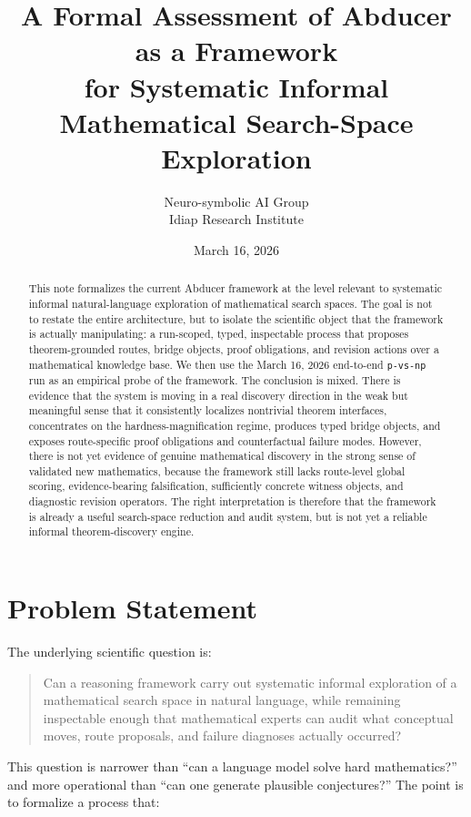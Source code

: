 \documentclass[11pt]{article}
\title{A Formal Assessment of Abducer as a Framework\\for Systematic Informal Mathematical Search-Space Exploration}
\author{Neuro-symbolic AI Group\\Idiap Research Institute}
\date{March 16, 2026}
\begin{document}
\maketitle

\begin{abstract}
This note formalizes the current Abducer framework at the level relevant to systematic informal natural-language exploration of mathematical search spaces. The goal is not to restate the entire architecture, but to isolate the scientific object that the framework is actually manipulating: a run-scoped, typed, inspectable process that proposes theorem-grounded routes, bridge objects, proof obligations, and revision actions over a mathematical knowledge base. We then use the March 16, 2026 end-to-end \texttt{p-vs-np} run as an empirical probe of the framework. The conclusion is mixed. There is evidence that the system is moving in a real discovery direction in the weak but meaningful sense that it consistently localizes nontrivial theorem interfaces, concentrates on the hardness-magnification regime, produces typed bridge objects, and exposes route-specific proof obligations and counterfactual failure modes. However, there is not yet evidence of genuine mathematical discovery in the strong sense of validated new mathematics, because the framework still lacks route-level global scoring, evidence-bearing falsification, sufficiently concrete witness objects, and diagnostic revision operators. The right interpretation is therefore that the framework is already a useful search-space reduction and audit system, but is not yet a reliable informal theorem-discovery engine.
\end{abstract}

\section{Problem Statement}

The underlying scientific question is:

\begin{quote}
Can a reasoning framework carry out systematic informal exploration of a mathematical search space in natural language, while remaining inspectable enough that mathematical experts can audit what conceptual moves, route proposals, and failure diagnoses actually occurred?
\end{quote}

This question is narrower than ``can a language model solve hard mathematics?'' and more operational than ``can one generate plausible conjectures?'' The point is to formalize a process that:
\end{document}
